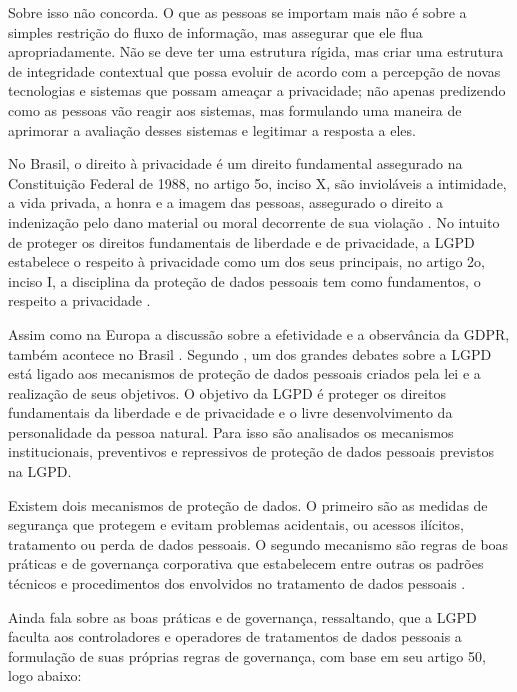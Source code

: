 Sobre isso \citet{Nissenbaum+2009} não concorda. O que as pessoas se importam mais não é sobre a simples restrição do fluxo de informação, mas assegurar que ele flua apropriadamente. Não se deve ter uma estrutura rígida, mas criar uma estrutura de integridade contextual que possa evoluir de acordo com a percepção de novas tecnologias e sistemas que possam ameaçar a privacidade; não apenas predizendo como as pessoas vão reagir aos sistemas, mas formulando uma maneira de aprimorar a avaliação desses sistemas e legitimar a resposta a eles.

No Brasil, o direito à privacidade é um direito fundamental assegurado na Constituição Federal de 1988, no artigo 5o, inciso X, são invioláveis a intimidade, a vida privada, a honra e a imagem das pessoas, assegurado o direito a indenização pelo dano material ou moral decorrente de sua violação \citep{Constitucao1988:online}. No intuito de proteger os direitos fundamentais de liberdade e de privacidade, a LGPD estabelece o respeito à privacidade como um dos seus principais, no artigo 2o, inciso I, a disciplina da proteção de dados pessoais tem como fundamentos, o respeito a privacidade \citep{L13709_2018:online}.

Assim como na Europa a discussão sobre a efetividade e a observância da GDPR, também acontece no Brasil \citep{monteiro_efetividade_2019}. Segundo \citet{monteiro_efetividade_2019}, um dos grandes debates sobre a LGPD está ligado aos mecanismos de proteção de dados pessoais criados pela lei e a realização de seus objetivos. O objetivo da LGPD é proteger os direitos fundamentais da liberdade e de privacidade e o livre desenvolvimento da personalidade da pessoa natural. Para isso são analisados os mecanismos institucionais, preventivos e repressivos de proteção de dados pessoais previstos na LGPD.

Existem dois mecanismos de proteção de dados. O primeiro são as medidas de segurança que protegem e evitam problemas acidentais, ou acessos ilícitos, tratamento ou perda de dados pessoais. O segundo mecanismo são regras de boas práticas e de governança corporativa que estabelecem entre outras os padrões técnicos e procedimentos dos envolvidos no tratamento de dados pessoais \citep{monteiro_efetividade_2019}.


Ainda \citet{monteiro_efetividade_2019} fala sobre as boas práticas e de governança, ressaltando, que a LGPD faculta aos controladores e operadores de tratamentos de dados pessoais a formulação de suas próprias regras de governança, com base em seu artigo 50, logo abaixo:

